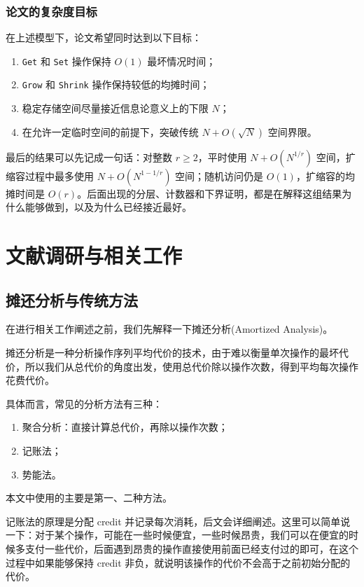 \documentclass[12pt,a4paper]{article}
\begin{document}
\subsubsection{论文的复杂度目标}

在上述模型下，论文希望同时达到以下目标：

\begin{enumerate}
    \item \texttt{Get} 和 \texttt{Set} 操作保持 $O(1)$ 最坏情况时间；
    \item \texttt{Grow} 和 \texttt{Shrink} 操作保持较低的均摊时间；
    \item 稳定存储空间尽量接近信息论意义上的下限 $N$；
    \item 在允许一定临时空间的前提下，突破传统 $N+O(\sqrt{N})$ 空间界限。
\end{enumerate}

最后的结果可以先记成一句话：对整数 $r\geq 2$，平时使用 $N+O(N^{1/r})$ 空间，扩缩容过程中最多使用 $N+O(N^{1-1/r})$ 空间；随机访问仍是 $O(1)$，扩缩容的均摊时间是 $O(r)$。后面出现的分层、计数器和下界证明，都是在解释这组结果为什么能够做到，以及为什么已经接近最好。


\section{文献调研与相关工作}

\subsection{摊还分析与传统方法}

在进行相关工作阐述之前，我们先解释一下摊还分析(Amortized Analysis)。

摊还分析是一种分析操作序列平均代价的技术，由于难以衡量单次操作的最坏代价，所以我们从总代价的角度出发，使用总代价除以操作次数，得到平均每次操作花费代价。

具体而言，常见的分析方法有三种：
\begin{enumerate}
    \item 聚合分析：直接计算总代价，再除以操作次数；
    \item 记账法；
    \item 势能法。
\end{enumerate}

本文中使用的主要是第一、二种方法。

记账法的原理是分配 credit 并记录每次消耗，后文会详细阐述。这里可以简单说一下：对于某个操作，可能在一些时候便宜，一些时候昂贵，我们可以在便宜的时候多支付一些代价，后面遇到昂贵的操作直接使用前面已经支付过的即可，在这个过程中如果能够保持 credit 非负，就说明该操作的代价不会高于之前初始分配的代价。
\end{document}
